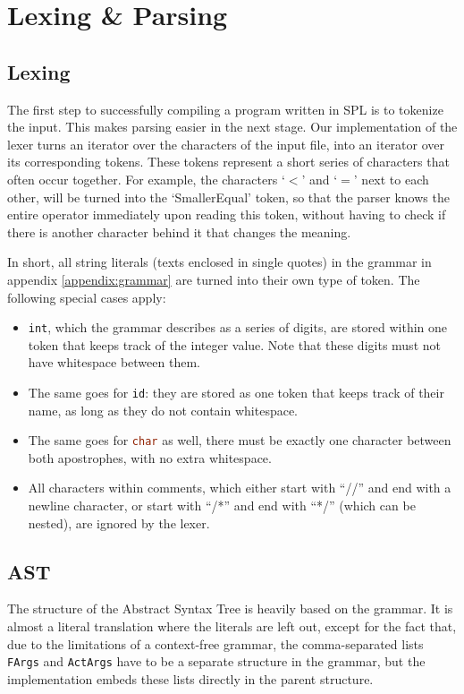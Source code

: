 \chapter{Lexing \& Parsing}\label{chapter:parsing}

\section{Lexing}
The first step to successfully compiling a program written in SPL is to tokenize the input. This makes parsing easier in the next stage. Our implementation of the lexer turns an iterator over the characters of the input file, into an iterator over its corresponding tokens. These tokens represent a short series of characters that often occur together. For example, the characters `$<$' and `$=$' next to each other, will be turned into the `SmallerEqual' token, so that the parser knows the entire operator immediately upon reading this token, without having to check if there is another character behind it that changes the meaning.

In short, all string literals (texts enclosed in single quotes) in the grammar in appendix \ref{appendix:grammar} are turned into their own type of token. The following special cases apply:

\begin{itemize}
    \item \lstinline[language=rust]|int|, which the grammar describes as a series of digits, are stored within one token that keeps track of the integer value. Note that these digits must not have whitespace between them.
    \item The same goes for \lstinline[language=rust]|id|: they are stored as one token that keeps track of their name, as long as they do not contain whitespace.
    \item The same goes for \lstinline[language=rust]|char| as well, there must be exactly one character between both apostrophes, with no extra whitespace.
    \item All characters within comments, which either start with ``//'' and end with a newline character, or start with ``/*'' and end with ``*/'' (which can be nested), are ignored by the lexer.
\end{itemize}

\section{AST}
The structure of the Abstract Syntax Tree is heavily based on the grammar. It is almost a literal translation where the literals are left out, except for the fact that, due to the limitations of a context-free grammar, the comma-separated lists \lstinline[language=rust]|FArgs| and \lstinline[language=rust]|ActArgs| have to be a separate structure in the grammar, but the implementation embeds these lists directly in the parent structure.

